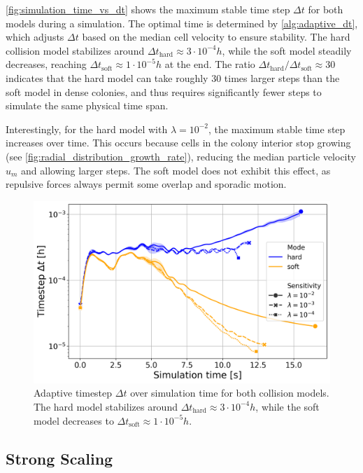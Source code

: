 \documentclass[conference]{IEEEtran}
\begin{document}
\autoref{fig:simulation_time_vs_dt} shows the maximum stable time step $\Delta t$ for both models during a simulation. The optimal time is determined by \autoref{alg:adaptive_dt}, which adjusts $\Delta t$ based on the median cell velocity to ensure stability. The hard collision model stabilizes around ${\Delta t}_{\text{hard}} \approx 3 \cdot 10^{-4} h$, while the soft model steadily decreases, reaching ${\Delta t}_{\text{soft}} \approx 1 \cdot 10^{-5} h$ at the end. The ratio ${\Delta t}_{\text{hard}}/{\Delta t}_{\text{soft}} \approx 30$ indicates that the hard model can take roughly 30 times larger steps than the soft model in dense colonies, and thus requires significantly fewer steps to simulate the same physical time span.

Interestingly, for the hard model with $\lambda=10^{-2}$, the maximum stable time step increases over time. This occurs because cells in the colony interior stop growing (see \autoref{fig:radial_distribution_growth_rate}), reducing the median particle velocity $u_m$ and allowing larger steps. The soft model does not exhibit this effect, as repulsive forces always permit some overlap and sporadic motion.

\begin{figure}[H]
    \centering
    \includegraphics[width=\linewidth]{figures/comparison_plots/combined_simulation_time [s]_vs_dt.png}
    \caption{Adaptive timestep $\Delta t$ over simulation time for both collision models. The hard model stabilizes around ${\Delta t}_{\text{hard}} \approx 3 \cdot 10^{-4} h$, while the soft model decreases to ${\Delta t}_{\text{soft}} \approx 1 \cdot 10^{-5} h$.} \label{fig:simulation_time_vs_dt}
\end{figure}


\subsection{Strong Scaling}
\label{sec:strong_scaling}
\end{document}
